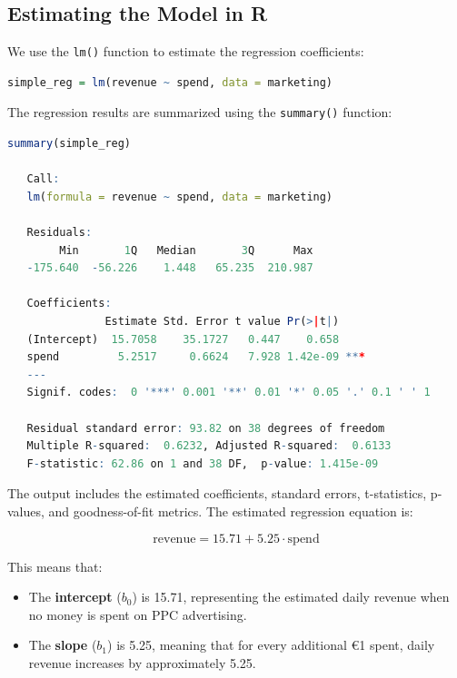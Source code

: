 \documentclass[
]{book}
\newcommand{\passthrough}[1]{#1}
\providecommand{\tightlist}{%
  \setlength{\itemsep}{0pt}\setlength{\parskip}{0pt}}
\theoremstyle{definition}
\theoremstyle{definition}
\theoremstyle{definition}
\theoremstyle{definition}
\theoremstyle{remark}
\begin{document}
\subsection*{Estimating the Model in R}\label{estimating-the-model-in-r}

We use the \passthrough{\lstinline!lm()!} function to estimate the regression coefficients:

\begin{lstlisting}[language=R]
simple_reg = lm(revenue ~ spend, data = marketing)
\end{lstlisting}

The regression results are summarized using the \passthrough{\lstinline!summary()!} function:

\begin{lstlisting}[language=R]
summary(simple_reg)
   
   Call:
   lm(formula = revenue ~ spend, data = marketing)
   
   Residuals:
        Min       1Q   Median       3Q      Max 
   -175.640  -56.226    1.448   65.235  210.987 
   
   Coefficients:
               Estimate Std. Error t value Pr(>|t|)    
   (Intercept)  15.7058    35.1727   0.447    0.658    
   spend         5.2517     0.6624   7.928 1.42e-09 ***
   ---
   Signif. codes:  0 '***' 0.001 '**' 0.01 '*' 0.05 '.' 0.1 ' ' 1
   
   Residual standard error: 93.82 on 38 degrees of freedom
   Multiple R-squared:  0.6232, Adjusted R-squared:  0.6133 
   F-statistic: 62.86 on 1 and 38 DF,  p-value: 1.415e-09
\end{lstlisting}

The output includes the estimated coefficients, standard errors, t-statistics, p-values, and goodness-of-fit metrics. The estimated regression equation is:

\[
\text{revenue} = 15.71 + 5.25 \cdot \text{spend}
\]

This means that:

\begin{itemize}
\tightlist
\item
  The \textbf{intercept} (\(b_0\)) is 15.71, representing the estimated daily revenue when no money is spent on PPC advertising.\\
\item
  The \textbf{slope} (\(b_1\)) is 5.25, meaning that for every additional €1 spent, daily revenue increases by approximately 5.25.
\end{itemize}
\end{document}
